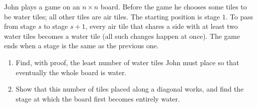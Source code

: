 John plays a game on an $n\times n$ board. Before the game he chooses some tiles to be water tiles; all other tiles are air tiles. The starting position is stage $1$. To pass from stage $s$ to stage $s+1$, every air tile that shares a side with at least two water tiles becomes a water tile (all such changes happen at once). The game ends when a stage is the same as the previous one.
\begin{enumerate}
\item[(a)] Find, with proof, the least number of water tiles John must place so that eventually the whole board is water.
\item[(b)] Show that this number of tiles placed along a diagonal works, and find the stage at which the board first becomes entirely water.
\end{enumerate}
